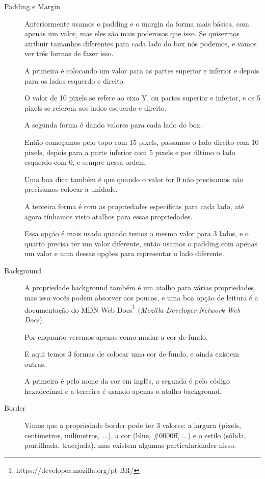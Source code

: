 \documentclass[12pt,a4paper]{article}
\begin{document}
	\begin{description}
		\item[Padding e Margin] Anteriormente usamos o padding e o margin da forma mais básica, com apenas um valor, mas eles são mais poderosos que isso. Se quisermos atribuir tamanhos diferentes para cada lado do box nós podemos, e vamos ver três formas de fazer isso.
		
		A primeira é colocando um valor para as partes superior e inferior e depois para os lados esquerdo e direito.
		
		O valor de 10 pixels se refere ao eixo Y, ou partes superior e inferior, e os 5 pixels se referem aos lados esquerdo e direito.
		
		A segunda forma é dando valores para cada lado do box.
		
		Então começamos pelo topo com 15 pixels, passamos o lado direito com 10 pixels, depois para a parte inferior com 5 pixels e por último o lado esquerdo com 0, e sempre nessa ordem.
		
		Uma boa dica também é que quando o valor for 0 não precisamos não precisamos colocar a unidade.
		
		A terceira forma é com as propriedades específicas para cada lado, até agora tínhamos visto atalhos para essas propriedades.
		
		Essa opção é mais usada quando temos o mesmo valor para 3 lados, e o quarto precisa ter um valor diferente, então usamos o padding com apenas um valor e uma dessas opções para representar o lado diferente.
		
		\item[Background] A propriedade background também é um atalho para várias propriedades, mas isso vocês podem absorver aos poucos, e uma boa opção de leitura é a documentação do MDN Web Docs\footnote{https://developer.mozilla.org/pt-BR/} (\textit{Mozilla Developer Network Web Docs}).
		
		Por enquanto veremos apenas como mudar a cor de fundo.
		
		E aqui temos 3 formas de colocar uma cor de fundo, e ainda existem outras.
		
		A primeira é pelo nome da cor em inglês, a segunda é pelo código hexadecimal e a terceira é usando apenas o atalho background.
		
		\item[Border] Vimos que a propriedade border pode ter 3 valores: a largura (pixels, centímetros, milímetros, ...), a cor (blue, \#0000ff, ...) e o estilo (sólida, pontilhada, tracejada), mas existem algumas particularidades nisso.
		

\end{description}
\end{document}
